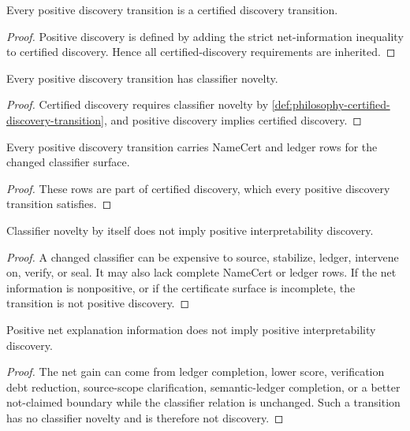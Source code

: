 \begin{theorem}
\label{thm:philosophy-positive-discovery-implies-certified-discovery}
Every positive discovery transition is a certified discovery transition.
\end{theorem}
\begin{proof}
Positive discovery is defined by adding the strict net-information
inequality to certified discovery. Hence all certified-discovery
requirements are inherited.
\end{proof}

\begin{corollary}
\label{cor:philosophy-positive-discovery-requires-classifier-novelty}
Every positive discovery transition has classifier novelty.
\end{corollary}
\begin{proof}
Certified discovery requires classifier novelty by
\autoref{def:philosophy-certified-discovery-transition}, and positive
discovery implies certified discovery.
\end{proof}

\begin{corollary}
\label{cor:philosophy-positive-discovery-requires-namecert-ledger}
Every positive discovery transition carries NameCert and ledger rows for
the changed classifier surface.
\end{corollary}
\begin{proof}
These rows are part of certified discovery, which every positive
discovery transition satisfies.
\end{proof}

\begin{theorem}
\label{thm:philosophy-classifier-novelty-alone-not-positive-discovery}
Classifier novelty by itself does not imply positive interpretability
discovery.
\end{theorem}
\begin{proof}
A changed classifier can be expensive to source, stabilize, ledger,
intervene on, verify, or seal. It may also lack complete NameCert or
ledger rows. If the net information is nonpositive, or if the certificate
surface is incomplete, the transition is not positive discovery.
\end{proof}

\begin{theorem}
\label{thm:philosophy-positive-information-alone-not-discovery}
Positive net explanation information does not imply positive
interpretability discovery.
\end{theorem}
\begin{proof}
The net gain can come from ledger completion, lower score, verification
debt reduction, source-scope clarification, semantic-ledger completion,
or a better not-claimed boundary while the classifier relation is
unchanged. Such a transition has no classifier novelty and is therefore
not discovery.
\end{proof}

